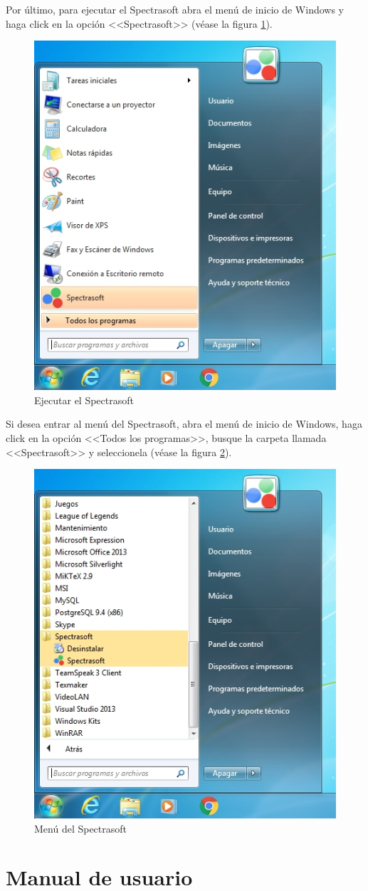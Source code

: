 Por \'{u}ltimo, para ejecutar el Spectrasoft abra el men\'{u} de inicio de Windows y haga click en la opci\'{o}n <<Spectrasoft>> (v\'{e}ase la figura \ref{fig:spectrasoft-ejecutable}).
\vfill
\begin{figure}[H]
  \centering
  \includegraphics[width=.4\linewidth]{./img/spectrasoft-ejecutable.jpg}
\caption[]{Ejecutar el Spectrasoft\label{fig:spectrasoft-ejecutable}}
\end{figure}
\vfill
Si desea entrar al men\'{u} del Spectrasoft, abra el men\'{u} de inicio de Windows, haga click en la opci\'{o}n <<Todos los programas>>, busque la carpeta llamada <<Spectrasoft>> y seleccionela (v\'{e}ase la figura \ref{fig:spectrasoft-menu}).
\vfill
\begin{figure}[H]
  \centering
  \includegraphics[width=.4\linewidth]{./img/spectrasoft-menu.jpg}
\caption[]{Men\'{u} del Spectrasoft\label{fig:spectrasoft-menu}}
\end{figure}
\vfill
\newpage
\chapter{Manual de usuario}
\thispagestyle{fancy}

\vfill
